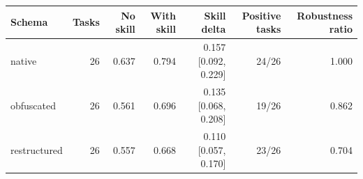 \begin{tabular}{lrrrrrr}
\toprule
Schema & Tasks & No skill & With skill & Skill delta & Positive tasks & Robustness ratio \\
\midrule
native & 26 & 0.637 & 0.794 & 0.157 [0.092, 0.229] & 24/26 & 1.000 \\
obfuscated & 26 & 0.561 & 0.696 & 0.135 [0.068, 0.208] & 19/26 & 0.862 \\
restructured & 26 & 0.557 & 0.668 & 0.110 [0.057, 0.170] & 23/26 & 0.704 \\
\bottomrule
\end{tabular}
